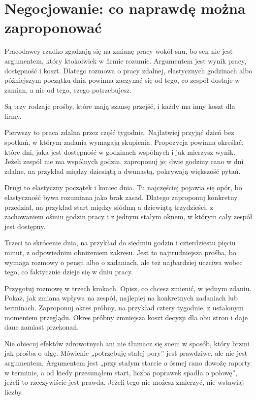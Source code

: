 \section{Negocjowanie: co naprawdę można zaproponować}

Pracodawcy rzadko zgadzają się na zmianę pracy wokół snu, bo sen nie jest argumentem, który ktokolwiek w firmie rozumie. Argumentem jest wynik pracy, dostępność i koszt. Dlatego rozmowa o pracy zdalnej, elastycznych godzinach albo późniejszym początku dnia powinna zaczynać się od tego, co zespół dostaje w zamian, a nie od tego, czego potrzebujesz.

Są trzy rodzaje prośby, które mają szansę przejść, i każdy ma inny koszt dla firmy.

Pierwszy to praca zdalna przez część tygodnia. Najłatwiej przyjąć dzień bez spotkań, w którym zadania wymagają skupienia. Propozycja powinna określać, które dni, jaka jest dostępność w godzinach wspólnych i jak mierzysz wynik. Jeżeli zespół nie ma wspólnych godzin, zaproponuj je: dwie godziny rano w dni zdalne, na przykład między dziesiątą a dwunastą, pokrywają większość pytań.

Drugi to elastyczny początek i koniec dnia. Tu najczęściej pojawia się opór, bo elastyczność bywa rozumiana jako brak zasad. Dlatego zaproponuj konkretny przedział, na przykład start między siódmą a dziewiątą trzydzieści, z zachowaniem ośmiu godzin pracy i z jednym stałym oknem, w którym cały zespół jest dostępny.

Trzeci to skrócenie dnia, na przykład do siedmiu godzin i czterdziestu pięciu minut, z odpowiednim obniżeniem zakresu. Jest to najtrudniejsza prośba, bo wymaga rozmowy o pensji albo o zadaniach, ale też najbardziej uczciwa wobec tego, co faktycznie dzieje się w dniu pracy.

Przygotuj rozmowę w trzech krokach. Opisz, co chcesz zmienić, w jednym zdaniu. Pokaż, jak zmiana wpływa na zespół, najlepiej na konkretnych zadaniach lub terminach. Zaproponuj okres próbny, na przykład cztery tygodnie, z ustalonym momentem przeglądu. Okres próbny zmniejsza koszt decyzji dla obu stron i daje dane zamiast przekonań.

Nie obiecuj efektów zdrowotnych ani nie tłumacz się snem w sposób, który brzmi jak prośba o ulgę. Mówienie „potrzebuję stałej pory” jest prawdziwe, ale nie jest argumentem. Argumentem jest „przy stałym starcie o ósmej rano dowożę raporty w terminie, a od kiedy przesunąłem start, liczba poprawek spadła o połowę”, jeżeli to rzeczywiście jest prawda. Jeżeli tego nie możesz zmierzyć, nie wstawiaj liczby.

